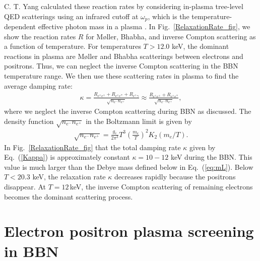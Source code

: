 C. T. Yang calculated these reaction rates by considering in-plasma tree-level QED scatterings using an infrared cutoff at $\omega_p$, which is the temperature-dependent effective photon mass in a plasma \cite{Yang:2024ret}.
In Fig.~\ref{RelaxationRate_fig}, we show the reaction rates $R$ for M{\o}ller, Bhabha, and inverse Compton scattering as a function of temperature. For temperatures $T>12.0$ keV, the dominant reactions in plasma are M{\o}ller and Bhabha scatterings between electrons and positrons. Thus, we can neglect the inverse Compton scattering in the BBN temperature range.
We then use these scattering rates in plasma to find the average damping rate:
\begin{align}\label{Kappa}
\kappa=\frac{R_{e^\pm e^\pm}+R_{e^\pm e^\mp}+R_{e^\pm\gamma}}{\sqrt{n_{e^-}n_{e^+}}}\approx\frac{R_{e^\pm e^\pm}+R_{e^\pm e^\mp}}{\sqrt{n_{e^-}n_{e^+}}},
\end{align}
where we neglect the inverse Compton scattering during BBN as discussed. The density function ${\sqrt{n_{e^-}n_{e^+}}}$ in the Boltzmann limit is given by
\begin{align}
{\sqrt{n_{e^-}n_{e^+}}}=\frac{g_e}{2\pi^3}T^3\left(\frac{m_e}{T}\right)^2K_2(m_e/T).
\end{align}
In Fig.~\ref{RelaxationRate_fig} that the total damping rate $\kappa$ given by Eq.~(\ref{Kappa}) is approximately constant $\kappa=10-12$ keV during the BBN. This value is much larger than the Debye mass defined below in Eq.~(\ref{eq:mL}). Below $T<20.3$ keV, the relaxation rate $\kappa$ decreases rapidly because the positrons disappear. At $T=12$\,keV, the inverse Compton scattering of remaining electrons becomes the dominant scattering process. 

\section{Electron positron plasma screening in BBN}\label{sec:Discussion}

